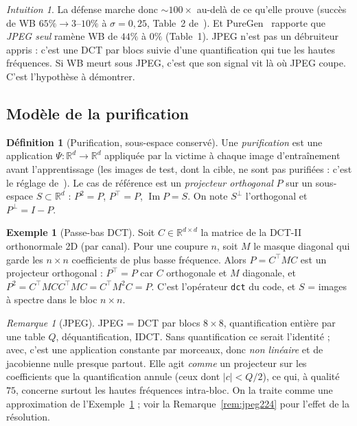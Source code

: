 \documentclass[11pt,a4paper]{article}
\theoremstyle{plain}
\theoremstyle{definition}
\newtheorem{definition}[theorem]{Définition}
\newtheorem{example}[theorem]{Exemple}
\theoremstyle{remark}
\newtheorem{remark}[theorem]{Remarque}
\newtheorem{intuition}[theorem]{Intuition}
\newcommand{\R}{\mathbb{R}}
\begin{document}
\begin{intuition}
La défense marche donc $\sim100\times$ au-delà de ce qu'elle prouve (succès de WB
$65\%\to3$--$10\%$ à $\sigma=0{,}25$, Table~2 de~\cite{hong2024}). Et PureGen~\cite{bhat2024puregen}
rapporte que \emph{JPEG seul} ramène WB de $44\%$ à $0\%$ (Table~1). JPEG n'est pas un débruiteur
appris : c'est une DCT par blocs suivie d'une quantification qui tue les hautes fréquences. Si WB
meurt sous JPEG, c'est que son signal vit là où JPEG coupe. C'est l'hypothèse à démontrer.
\end{intuition}

\subsection{Modèle de la purification}

\begin{definition}[Purification, sous-espace conservé]
Une \emph{purification} est une application $\Psi:\R^d\to\R^d$ appliquée par la victime à chaque
image d'entraînement avant l'apprentissage (les images de test, dont la cible, ne sont pas
purifiées : c'est le réglage de~\cite[Cor.~3.5]{hong2024}). Le cas de référence est un
\emph{projecteur orthogonal} $P$ sur un sous-espace $S\subset\R^d$ : $P^2=P$, $P^\top=P$,
$\operatorname{Im}P=S$. On note $S^\perp$ l'orthogonal et $P^\perp=I-P$.
\end{definition}

\begin{example}[Passe-bas DCT]\label{ex:dct}
Soit $C\in\R^{d\times d}$ la matrice de la DCT-II orthonormale 2D (par canal). Pour une
coupure $n$, soit $M$ le masque diagonal qui garde les $n\times n$ coefficients de plus basse
fréquence. Alors $P=C^\top MC$ est un projecteur orthogonal : $P^\top=P$ car $C$ orthogonale et
$M$ diagonale, et $P^2=C^\top MCC^\top MC=C^\top M^2C=P$. C'est l'opérateur \texttt{dct} du code,
et $S$ = images à spectre dans le bloc $n\times n$.
\end{example}

\begin{remark}[JPEG]
JPEG = DCT par blocs $8\times8$, quantification entière par une table $Q$, déquantification, IDCT.
Sans quantification ce serait l'identité ; avec, c'est une application constante par morceaux,
donc \emph{non linéaire} et de jacobienne nulle presque partout. Elle agit \emph{comme} un
projecteur sur les coefficients que la quantification annule (ceux dont $|c|<Q/2$), ce qui, à
qualité $75$, concerne surtout les hautes fréquences intra-bloc. On la traite comme une
approximation de l'Exemple~\ref{ex:dct} ; voir la Remarque~\ref{rem:jpeg224} pour l'effet de la
résolution.
\end{remark}
\end{document}
